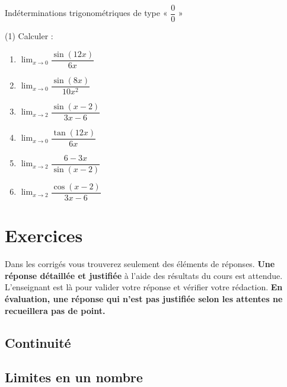 \documentclass[a4paper,12pt]{article}
\begin{document}
\begin{activite}{Indéterminations trigonométriques de type « $\dfrac{0}{0}$ »}
\tcblower
\begin{tasks}(1)
\task Calculer :
\begin{multicols}{3}
\begin{enumerate}
\item $\displaystyle\lim_{x \to 0} \dfrac{\sin(12x)}{6x}$
\item $\displaystyle\lim_{x \to 0} \dfrac{\sin(8x)}{10x^2}$
\item $\displaystyle\lim_{x \to 2} \dfrac{\sin(x-2)}{3x-6}$
\item $\displaystyle\lim_{x \to 0} \dfrac{\tan(12x)}{6x}$
\item $\displaystyle\lim_{x \to 2} \dfrac{6-3x}{\sin(x-2)}$
\item $\displaystyle\lim_{x \to 2} \dfrac{\cos(x-2)}{3x-6}$
\end{enumerate}
\end{multicols}
\end{tasks}
\end{activite}

\newpage

\section{Exercices}
Dans les corrigés vous trouverez seulement des éléments de réponses. {\bfseries Une réponse détaillée et justifiée} à l'aide des résultats du cours est attendue. L'enseignant est là pour valider votre réponse et vérifier votre rédaction. {\bfseries En évaluation, une réponse qui n'est pas justifiée selon les attentes ne recueillera pas de point.} 

\subsection{Continuité}
\subsection{Limites en un nombre}
\end{document}

